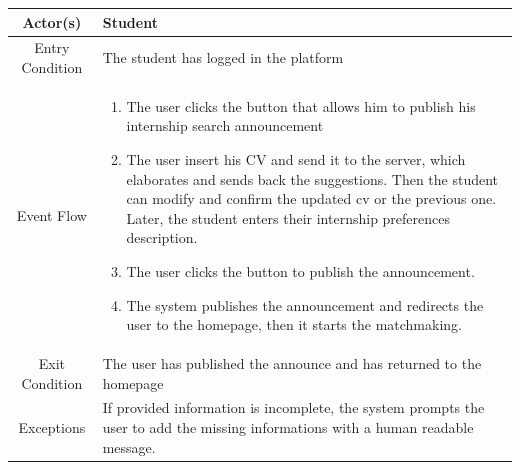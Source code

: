 \documentclass{article}
\begin{document}
\begin{table}[H]
    \centering
    \begin{tabular}{|c|p{10cm}|}
    \hline
        Actor(s)  & Student\\ 
    \hline
        Entry Condition &  
        The student has logged in the platform \\
    \hline
        Event Flow &
        \begin{enumerate}
            \item The user clicks the button that allows him to publish his internship search announcement
            \item The user insert his CV and send it to the server, which elaborates and sends back the suggestions. Then the student can modify and confirm the updated cv or the previous one. Later, the student enters their internship preferences description.
            \item The user clicks the button to publish the announcement.
            \item The system publishes the announcement and redirects the user to the homepage, then it starts the matchmaking.
        \end{enumerate}
         \\
    \hline
        Exit Condition & The user has published the announce and has returned to the homepage \\
    \hline
        Exceptions &  If provided information is incomplete, the system prompts the user to add the missing informations with a human readable message.\\
    \hline
    \end{tabular}
    \label{tab:my_label}
\end{table}
\end{document}

